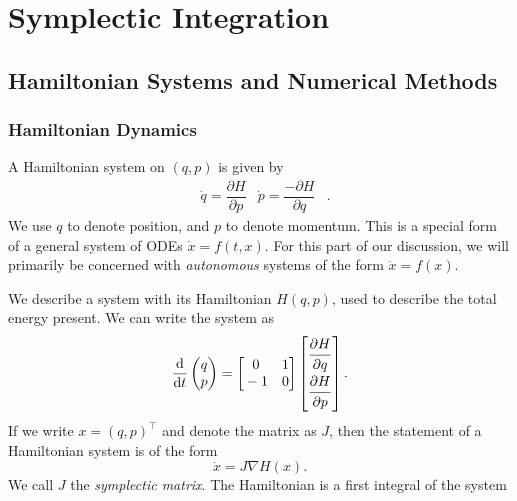 

\chapter{Symplectic Integration}
\label{cha:ham}

\section{Hamiltonian Systems and Numerical Methods}

\subsection{Hamiltonian Dynamics}

A Hamiltonian system on $(q,p)$ \cite{gni2006} is given by
\begin{align*}
	&\dot{q} = \dfrac{\partial H}{\partial p}
	&
	\dot{p} = \dfrac{-\partial H}{\partial q}&.	
\end{align*}
We use $q$ to denote position, and $p$ to denote momentum.
This is a special form of a general system of ODEs $\dot{x} = f(t,x)$.
For this part of our discussion, we will primarily be concerned with \textit{autonomous} systems of the form $\dot{x} = f(x)$.

We describe a system with its Hamiltonian $H(q,p)$, used to describe the total energy present.
We can write the system as
\begin{equation}
	\dfrac{\mathrm{d}}{\mathrm{d}t}\begin{pmatrix}
		q \\
		p
	\end{pmatrix} = \begin{bmatrix}
		\strut 0 & \strut 1 \\
		\strut -1 & \strut 0
	\end{bmatrix}\begin{bmatrix}
	\dfrac{\strut \partial H}{\strut\partial q} \\
	\dfrac{\strut \partial H}{\strut\partial p}
	\end{bmatrix}.
\end{equation}
If we write $x = (q,p)^\top$ and denote the matrix as $J$,
then the statement of a Hamiltonian system is of the form 
\begin{equation}
	{\dot{x}} = {J}\nabla H({x}).
	\label{eqn:hdyn}
\end{equation}
We call $J$ the \textit{symplectic matrix}.
The Hamiltonian is a first integral of the system

